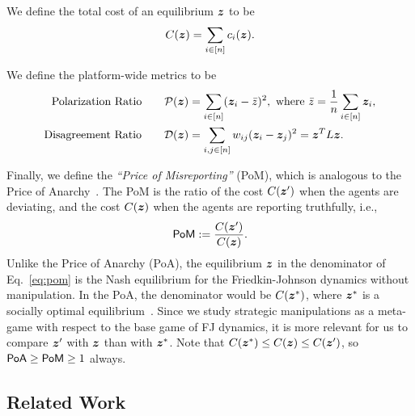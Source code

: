 We define the total cost of an equilibrium $\bm{z}$ to be 
\begin{equation}
    C(\bm{z}) = \sum_{i \in [n]} c_i(\bm{z}).
\end{equation}

We define the platform-wide metrics to be
\begin{align}
    \textrm{Polarization Ratio} \qquad \mathcal P(\bm{z}) &= \sum_{i \in [n]} (\bm{z}_i - \bar z)^2, \text{ where } \bar z = \frac 1 n \sum_{i \in [n]} \bm{z}_i, \\
    \textrm{Disagreement Ratio} \qquad \mathcal D(\bm{z}) &= \sum_{i, j \in [n]} w_{ij} (\bm{z}_i - \bm{z}_j)^2 = \bm{z}^T L \bm{z}. 
\end{align}

Finally, we define the \textit{``Price of Misreporting''} (PoM), which is analogous to the Price of Anarchy~\cite{roughgarden2005selfish}. The PoM is the ratio of the cost $C(\bm{z}^\prime)$ when the agents are deviating, and the cost $C(\bm{z})$ when the agents are reporting truthfully, i.e.,   
\begin{equation}
    \mathsf{PoM} := \frac {C(\bm{z}^\prime)}{C(\bm{z})}.
    \label{eq:pom}
\end{equation}
Unlike the Price of Anarchy (PoA), the equilibrium $\bm{z}$ in the denominator of Eq.~\eqref{eq:pom} is the Nash equilibrium for the Friedkin-Johnson dynamics without manipulation. In the PoA, the denominator would be $C(\bm{z}^*)$, where $\bm{z}^*$ is a socially optimal equilibrium~\cite{bindel2011}. 
Since we study strategic manipulations as a meta-game with respect to the base game of FJ dynamics, it is more relevant for us to compare $\bm{z}^\prime$ with $\bm{z}$ than with $\bm{z}^*$. Note that $C(\bm{z}^*) \leq C(\bm{z}) \leq C(\bm{z}^\prime)$, so $\mathsf{PoA} \geq \mathsf{PoM} \ge 1$ always. 

\subsection{Related Work}


